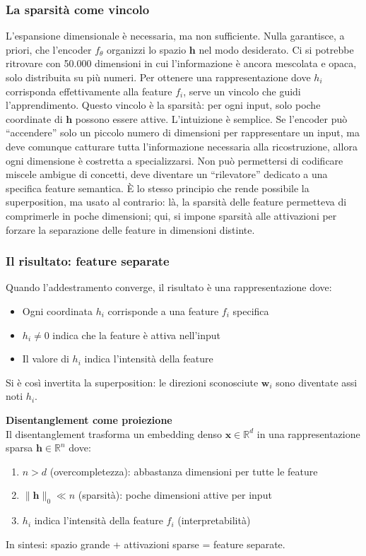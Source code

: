 \subsubsection{La sparsità come vincolo}
L'espansione dimensionale è necessaria, ma non sufficiente. Nulla garantisce, a priori, che l'encoder $f_\theta$ organizzi lo spazio $\mathbf{h}$ nel modo desiderato. Ci si potrebbe ritrovare con 50.000 dimensioni in cui l'informazione è ancora mescolata e opaca, solo distribuita su più numeri.
Per ottenere una rappresentazione dove $h_i$ corrisponda effettivamente alla feature $f_i$, serve un vincolo che guidi l'apprendimento. Questo vincolo è la sparsità: per ogni input, solo poche coordinate di $\mathbf{h}$ possono essere attive.
L'intuizione è semplice. Se l'encoder può ``accendere'' solo un piccolo numero di dimensioni per rappresentare un input, ma deve comunque catturare tutta l'informazione necessaria alla ricostruzione, allora ogni dimensione è costretta a specializzarsi. Non può permettersi di codificare miscele ambigue di concetti, deve diventare un ``rilevatore'' dedicato a una specifica feature semantica.
È lo stesso principio che rende possibile la superposition, ma usato al contrario: là, la sparsità delle feature permetteva di comprimerle in poche dimensioni; qui, si impone sparsità alle attivazioni per forzare la separazione delle feature in dimensioni distinte.

\subsubsection{Il risultato: feature separate}

Quando l'addestramento converge, il risultato è una rappresentazione dove:
\begin{itemize}
    \item Ogni coordinata $h_i$ corrisponde a una feature $f_i$ specifica
    \item $h_i \neq 0$ indica che la feature è attiva nell'input
    \item Il valore di $h_i$ indica l'intensità della feature
\end{itemize}

Si è così invertita la superposition: le direzioni sconosciute $\mathbf{w}_i$ sono diventate assi noti $h_i$.

\begin{notebox}
\textbf{Disentanglement come proiezione}\\
Il disentanglement trasforma un embedding denso $\mathbf{x} \in \mathbb{R}^d$ in una rappresentazione sparsa $\mathbf{h} \in \mathbb{R}^n$ dove:
\begin{enumerate}
    \item $n > d$ (overcompletezza): abbastanza dimensioni per tutte le feature
    \item $\|\mathbf{h}\|_0 \ll n$ (sparsità): poche dimensioni attive per input
    \item $h_i$ indica l'intensità della feature $f_i$ (interpretabilità)
\end{enumerate}
In sintesi: spazio grande + attivazioni sparse = feature separate.
\end{notebox}

